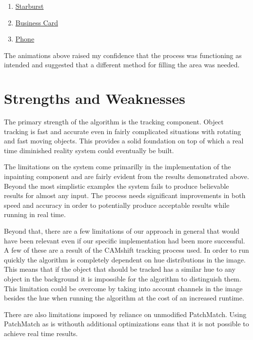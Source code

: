 \documentclass[12pt]{article}
\begin{document}
\begin{enumerate}
    \item \href{http://i.imgur.com/97LCKBh.webm}{Starburst}
    \item \href{https://www.dropbox.com/s/5rqp2byfzef4rhh/card.gif?dl=0}{Business Card}
    \item \href{https://www.dropbox.com/s/72h1hadv85pqgy1/dal.gif?dl=0}{Phone}
\end{enumerate}

The animations above raised my confidence that the process was functioning as intended and suggested that a different method for filling the area was needed. 

\section{Strengths and Weaknesses}
The primary strength of the algorithm is the tracking component. Object tracking is fast and accurate even in fairly complicated situations with rotating and fast moving objects. This provides a solid foundation on top of which a real time diminished reality system could eventually be built. 

The limitations on the system come primarilly in the implementation of the inpainting component and are fairly evident from the results demonstrated above. Beyond the most simplistic examples the system fails to produce believable results for almost any input. The process needs significant improvements in both speed and accuracy in order to potentially produce acceptable results while running in real time.

Beyond that, there are a few limitations of our approach in general that would have been relevant even if our specific implementation had been more successful. A few of these are a result of the CAMshift tracking process used. In order to run quickly the algorithm is completely dependent on hue distributions in the image. This means that if the object that should be tracked has a similar hue to any object in the background it is impossible for the algorithm to distinguish them. This limitation could be overcome by taking into account channels in the image besides the hue when running the algorithm at the cost of an increased runtime. 

There are also limitations imposed by reliance on unmodified PatchMatch. Using PatchMatch as is withouth additional optimizations eans that it is not possible to achieve real time results.
\end{document}
